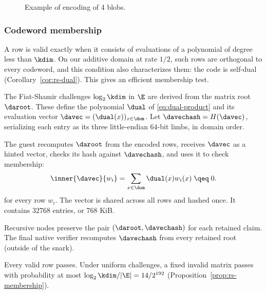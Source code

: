 \begin{figure}[htbp]
\caption{Example of encoding of 4 blobs.}
\label{fig:da-hashing}
\end{figure}

\subsubsection{Codeword membership}\label{sec:da-membership}\label{sec:da-circuit}

A row is valid exactly when it consists of evaluations of a polynomial of degree less than $\kdim$. On our additive domain at rate $1/2$, such rows are orthogonal to every codeword, and this condition also characterizes them: the code is self-dual (Corollary~\ref{cor:rs-dual}). This gives an efficient membership test.

The Fiat-Shamir challenges $\log_2\kdim$ in $\E$ are derived from the matrix root $\daroot$. These define the polynomial $\dual$ of \eqref{eq:dual-product} and its evaluation vector $\davec=(\dual(x))_{x\in\dom}$. Let $\davechash=H(\davec)$, serializing each entry as its three little-endian $64$-bit limbs, in domain order.

The guest recomputes $\daroot$ from the encoded rows, receives $\davec$ as a hinted vector, checks its hash against $\davechash$, and uses it to check membership:
\[
  \inner{\davec}{w_i}
  =\sum_{x\in\dom}\dual(x)w_i(x)
  \;\qeq\;0.
\]
for every row $w_i$. The vector is shared across all rows and hashed once. It contains $32768$ entries, or $768$ KiB.

Recursive nodes preserve the pair $(\daroot,\davechash)$ for each retained claim. The final native verifier recomputes $\davechash$ from every retained root (outside of the snark).

Every valid row passes. Under uniform challenges, a fixed invalid matrix passes with probability at most $\log_2\kdim/|\E|=14/2^{192}$ (Proposition~\ref{prop:rs-membership}).

